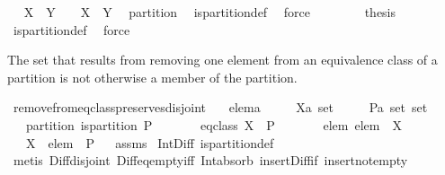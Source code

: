 \begin{isabellebody}
\ \isamarkupfalse%
\ {\isachardoublequoteopen}X\ {\isasyminter}\ Y\ {\isasymnoteq}\ {\isacharbraceleft}{\isacharbraceright}\ {\isasymlongleftrightarrow}\ X\ {\isacharequal}\ Y{\isachardoublequoteclose}\ \isamarkupfalse%
\ partition\ \isamarkupfalse%
\ is{\isacharunderscore}partition{\isacharunderscore}def\ \isamarkupfalse%
\ force\isanewline
\ \ \isacommand{{\isacharbraceright}}\isamarkupfalse%
\isanewline
\ \ \isamarkupfalse%
\ \isamarkupfalse%
\ {\isacharquery}thesis\ \isamarkupfalse%
\ is{\isacharunderscore}partition{\isacharunderscore}def\ \isamarkupfalse%
\ force\isanewline
{}\isamarkupfalse%
%
\endisatagproof
{\isafoldproof}%
%
\isadelimproof
%
\endisadelimproof
%
\begin{isamarkuptext}%
The set that results from removing one element from an equivalence class of a partition
  is not otherwise a member of the partition.%
\end{isamarkuptext}%
\isamarkuptrue%
\isamarkupfalse%
\ remove{\isacharunderscore}from{\isacharunderscore}eq{\isacharunderscore}class{\isacharunderscore}preserves{\isacharunderscore}disjoint{\isacharcolon}\isanewline
\ \ \ elem{\isacharcolon}{\isacharcolon}{\isacharprime}a\isanewline
\ \ \ \ \ X{\isacharcolon}{\isacharcolon}{\isachardoublequoteopen}{\isacharprime}a\ set{\isachardoublequoteclose}\isanewline
\ \ \ \ \ P{\isacharcolon}{\isacharcolon}{\isachardoublequoteopen}{\isacharprime}a\ set\ set{\isachardoublequoteclose}\isanewline
\ \ \ partition{\isacharcolon}\ {\isachardoublequoteopen}is{\isacharunderscore}partition\ P{\isachardoublequoteclose}\isanewline
\ \ \ \ \ \ \ eq{\isacharunderscore}class{\isacharcolon}\ {\isachardoublequoteopen}X\ {\isasymin}\ P{\isachardoublequoteclose}\isanewline
\ \ \ \ \ \ \ elem{\isacharcolon}\ {\isachardoublequoteopen}elem\ {\isasymin}\ X{\isachardoublequoteclose}\isanewline
\ \ \ {\isachardoublequoteopen}X\ {\isacharminus}\ {\isacharbraceleft}elem{\isacharbraceright}\ {\isasymnotin}\ P{\isachardoublequoteclose}\isanewline
%
\isadelimproof
\ %
\endisadelimproof
%
\isatagproof
{}\isamarkupfalse%
\ assms\isanewline
\ Int{\isacharunderscore}Diff\ is{\isacharunderscore}partition{\isacharunderscore}def\ \isanewline
{}\isamarkupfalse%
\ {\isacharparenleft}metis\ Diff{\isacharunderscore}disjoint\ Diff{\isacharunderscore}eq{\isacharunderscore}empty{\isacharunderscore}iff\ Int{\isacharunderscore}absorb{}\ insert{\isacharunderscore}Diff{\isacharunderscore}if\ insert{\isacharunderscore}not{\isacharunderscore}empty{\isacharparenright}%

\end{isabellebody}
